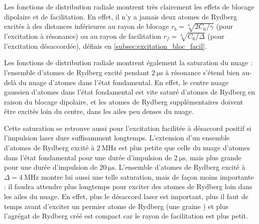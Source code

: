 Les fonctions de distribution radiale montrent très clairement les effets de blocage dipolaire et de facilitation.
En effet, il n'y a jamais deux atomes de Rydberg excités à des distances inférieures au rayon de blocage $r_b=\sqrt[6]{2C_6/\gamma}$ (pour l'excitation à résonance) ou au rayon de facilitation $r_f=\sqrt[6]{C_6/\Delta}$ (pour l'excitation désaccordée), définis en \ref{subsec:excitation_bloc_facil}.

Les fonctions de distribution radiale montrent également la saturation du nuage : l'ensemble d'atomes de Rydberg excité pendant $\SI{2}{\us}$ à résonance s'étend bien au-delà du nuage d'atomes dans l'état fondamental.
En effet, le centre nuage gaussien d'atomes dans l'état fondamental est vite saturé d'atomes de Rydberg en raison du blocage dipolaire, et les atomes de Rydberg supplémentaires doivent être excités loin du centre, dans les ailes peu denses du nuage.

Cette saturation se retrouve aussi pour l'excitation facilitée à désaccord positif si l'impulsion laser dure suffisamment longtemps.
L'extension d'un ensemble d'atomes de Rydberg excité à $\SI{2}{\MHz}$
est plus petite que celle du nuage d'atomes dans l'état fondamental pour une durée d'impulsion de $\SI{2}{\us}$, mais plus grande pour une durée d'impulsion de $\SI{20}{\us}$.
L'ensemble d'atomes de Rydberg excité à $\Delta=\SI{4}{\MHz}$ montre lui aussi une telle saturation, mais de façon moins importante : il faudra attendre plus longtemps pour exciter des atomes de Rydberg loin dans les ailes du nuage.
En effet, plus le désaccord laser est important, plus il faut de temps avant d'exciter un  permier atome de Rydberg (une \og graine \fg{}) et plus l'agrégat de Rydberg créé est compact car le rayon de facilitation est plus petit.

